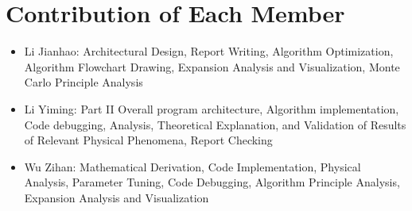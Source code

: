 \documentclass[11pt]{article}
\providecommand{\tightlist}{%
      \setlength{\itemsep}{0pt}\setlength{\parskip}{0pt}}
\begin{document}
    \section{Contribution of Each Member}\label{contribution-of-each-member}

\begin{itemize}
\tightlist
\item
  Li Jianhao: Architectural Design, Report Writing, Algorithm
  Optimization, Algorithm Flowchart Drawing, Expansion Analysis and
  Visualization, Monte Carlo Principle Analysis
\item
  Li Yiming: Part II Overall program architecture, Algorithm
  implementation, Code debugging, Analysis, Theoretical Explanation, and
  Validation of Results of Relevant Physical Phenomena, Report Checking
\item
  Wu Zihan: Mathematical Derivation, Code Implementation, Physical
  Analysis, Parameter Tuning, Code Debugging, Algorithm Principle
  Analysis, Expansion Analysis and Visualization
\end{itemize}


    
    
    
\end{document}
